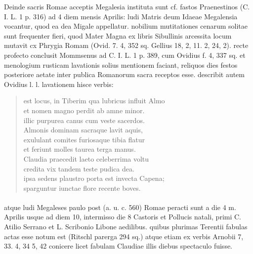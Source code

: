 \documentclass[a4paper, 11pt, oneside, polutonikogreek, german, twocolumn]{article}
\begin{document}
Deinde sacris Romae acceptis Megalesia instituta sunt cf. fastos Praenestinos (C. I. L. 1 p. 316) ad 4 diem mensis Aprilis: ludi Matris deum Idaeae Megalensia vocantur, quod ea dea Migale appellatur. nobilium mutitationes cenarum solitae sunt frequenter fieri, quod Mater Magna ex libris Sibullinis arcessita locum mutavit cx Phrygia Romam (Ovid. 7. 4, 352 sq. Gellius 18, 2, 11. 2, 24, 2). recte profecto conclusit Mommsenus ad C. I. L. 1 p. 389, cum Ovidius f. 4, 337 sq. et menologium rusticam lavationis solius mentionem faciant, reliquos dies festos posteriore aetate inter publica Romanorum sacra receptos esse. describit autem Ovidius l. l. lavationem hisce verbis:
\begin{quotation}
est locus, in Tiberim qua lubricus influit Almo\\\hspace*{10mm}et nomen magno perdit ab amne minor.\\\hspace*{5mm}illic purpurea canus cum veste sacerdos.\\\hspace*{10mm}Almonis dominam sacraque lavit aquis,\\\hspace*{5mm}exululant comites furiosaque tibia flatur\\\hspace*{10mm}et feriunt molles taurea terga manus.\\\hspace*{5mm}Claudia praecedit laeto celeberrima voltu\\\hspace*{10mm}credita vix tandem teste pudica dea.\\\hspace*{5mm}ipsa sedens plaustro porta est invecta Capena;\\\hspace*{10mm}sparguntur iunctae flore recente boves.
\end{quotation}
\paragraph{}
atque ludi Megaleses paulo post (a. u. c. 560) Romae peracti sunt a die 4 m. Aprilis usque ad diem 10, intermisso die 8 Castoris et Pollucis natali, primi C. Atilio Serrano et L. Scribonio Libone aedilibus. quibus plurimas Terentii fabulas actas esse notum est (Ritschl parerga 294 sq.) atque etiam ex verbis Arnobii 7, 33. 4, 34 5, 42 conicere licet fabulam Claudiae illis diebus spectaculo fuisse.
\end{document}

